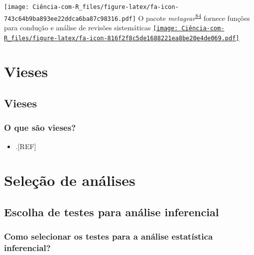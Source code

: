 \documentclass[
]{book}
\providecommand{\tightlist}{%
  \setlength{\itemsep}{0pt}\setlength{\parskip}{0pt}}
\begin{document}
\texttt{[image: Ciência-com-R\_files/figure-latex/fa-icon-743c64b9ba893ee22ddca6ba87c98316.pdf]} O pacote \emph{metagear}\textsuperscript{\protect\hyperlink{ref-metagear}{84}} fornece funções para condução e análise de revisões sistemáticas \href{https://cran.r-project.org/web/packages/metagear/index.html}{\texttt{[image: Ciência-com-R\_files/figure-latex/fa-icon-816f2f8c5de1688221ea8be20e4de069.pdf]}}

\hypertarget{vieses}{%
\chapter{\texorpdfstring{\textbf{Vieses}}{Vieses}}\label{vieses}}

\hypertarget{vieses}{%
\section{Vieses}\label{vieses}}

\hypertarget{o-que-suxe3o-vieses}{%
\subsection{O que são vieses?}\label{o-que-suxe3o-vieses}}

\begin{itemize}
\tightlist
\item
  .{[}REF{]}
\end{itemize}

\hypertarget{selecao-analise}{%
\chapter{\texorpdfstring{\textbf{Seleção de análises}}{Seleção de análises}}\label{selecao-analise}}

\hypertarget{escolha-analise-inferencial}{%
\section{Escolha de testes para análise inferencial}\label{escolha-analise-inferencial}}

\hypertarget{como-selecionar-os-testes-para-a-anuxe1lise-estatuxedstica-inferencial}{%
\subsection{Como selecionar os testes para a análise estatística inferencial?}\label{como-selecionar-os-testes-para-a-anuxe1lise-estatuxedstica-inferencial}}
\end{document}
